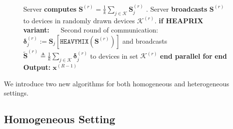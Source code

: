 \documentclass[11pt]{article}
\begin{document}
\begin{figure}
\begin{minipage}{\linewidth}
\begin{algorithm}[H]
\begin{algorithmic}[1]
\STATE Server \textbf{computes} $ {\mathbf{S}}^{(r)}=\frac{1}{k}\sum_{j\in\mathcal{K}}\mathbf{S}^{(r)}_{j}$ .\label{line:heaprix2}
\STATE Server \textbf{broadcasts} ${\mathbf{S}}^{(r)}$ to devices in randomly drawn devices $\mathcal{K}^{(r)}$.
\vspace{0.1cm}
\STATE \hspace{0.04in} \textbf{if HEAPRIX variant:} 
\STATE $\quad$ Second round of communication: $\mathbf{\delta}_j^{(r)} :=  \mathbf{S}_j\left[\texttt{HEAVYMIX}(\mathbf{S}^{(r)})\right]$ and broadcasts $\tilde{\mathbf{S}}^{(r)}\triangleq\frac{1}{k}\sum_{j\in\mathcal{K}}\mathbf{\delta}_j^{(r)}$ to devices in set $\mathcal{K}^{(r)}$
\vspace{0.1cm}
\STATE \textbf{end parallel for}
\STATE \textbf{end}
\STATE \textbf{Output:} ${\boldsymbol{x}}^{(R-1)}$
\vspace{- 0.1cm}
\end{algorithmic}
\end{algorithm}
\vspace{-0.1in}
\end{minipage}\end{figure}

We introduce two new algorithms for both homogeneous and heterogeneous settings.


\vspace{-0.1in}
\subsection{Homogeneous Setting}
\vspace{-0.05in}
\end{document}
